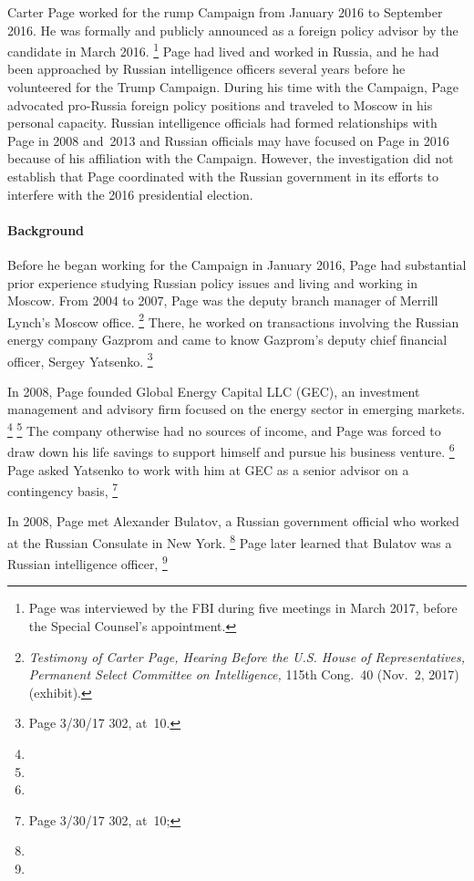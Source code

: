 Carter Page worked for the rump Campaign from January 2016 to September 2016.
He was formally and publicly announced as a foreign policy advisor by the candidate in March 2016.%
\footnote{Page was interviewed by the FBI during five meetings in March 2017, before the Special Counsel's appointment.
}
Page had lived and worked in Russia, and he had been approached by Russian intelligence officers several years before he volunteered for the Trump Campaign.
During his time with the Campaign, Page advocated pro-Russia foreign policy positions and traveled to Moscow in his personal capacity.
Russian intelligence officials had formed relationships with Page in 2008 and~2013 and Russian officials may have focused on Page in 2016 because of his affiliation with the Campaign.
However, the investigation did not establish that Page coordinated with the Russian government in its efforts to interfere with the 2016 presidential election.

\paragraph{Background}

Before he began working for the Campaign in January 2016, Page had substantial prior experience studying Russian policy issues and living and working in Moscow.
From 2004 to 2007, Page was the deputy branch manager of Merrill Lynch's Moscow office.%
\footnote{\textit{Testimony of Carter Page, Hearing Before the U.S. House of Representatives, Permanent Select Committee on Intelligence,} 115th Cong.~40 (Nov.~2, 2017) (exhibit).}
There, he worked on transactions involving the Russian energy company Gazprom and came to know Gazprom's deputy chief financial officer, Sergey Yatsenko.%
\footnote{Page 3/30/17 302, at~10.}

In 2008, Page founded Global Energy Capital LLC (GEC), an investment management and advisory firm focused on the energy sector in emerging markets.%
\footnote{}
\footnote{}
The company otherwise had no sources of income, and Page was forced to draw down his life savings to support himself and pursue his business venture.%
\footnote{}
Page asked Yatsenko to work with him at GEC as a senior advisor on a contingency basis,
\footnote{Page 3/30/17 302, at~10; }

In 2008, Page met Alexander Bulatov, a Russian government official who worked at the Russian Consulate in New York.%
\footnote{}
Page later learned that Bulatov was a Russian intelligence officer,
\footnote{}

